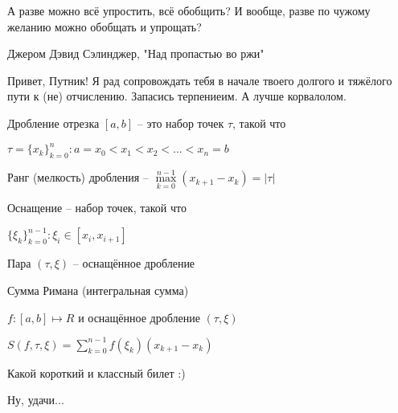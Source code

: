 \epigraph{А разве можно всё упростить, всё обобщить? И вообще, разве по чужому желанию можно обобщать и упрощать?}{Джером Дэвид Сэлинджер, "Над пропастью во ржи"}

Привет, Путник! Я рад сопровождать тебя в начале твоего долгого и тяжёлого пути к (не) отчислению. Запасись терпениеим. А лучше корвалолом.


\begin{definition} \thmslashn 

	Дробление отрезка $[a,b]$ -- это набор точек $\tau$, такой что
	
	$\tau = \{x_k\}^n_{k=0} : a = x_0 < x_1 < x_2 < ... < x_n = b$

	Ранг (мелкость) дробления -- $\max\limits_{k=0}^{n-1}(x_{k+1} - x_{k}) = |\tau|$ 

	Оснащение -- набор точек, такой что

	$\{\xi_k\}_{k=0}^{n-1} : \xi_i \in [x_i, x_{i+1}]$

	Пара $(\tau, \xi)$ -- оснащённое дробление

\end{definition}

\begin{definition} \thmslashn 

	Сумма Римана (интегральная сумма)

	$f : [a,b] \mapsto R$ и оснащённое дробление $(\tau, \xi)$

	$S(f,\tau,\xi) = \sum\limits_{k=0}^{n-1} f(\xi_k)(x_{k+1} - x_{k})$

\end{definition}


Какой короткий и классный билет :)

Ну, удачи...
